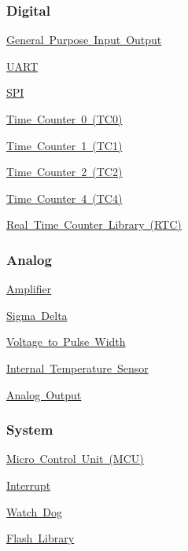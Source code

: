 \subsubsection*{Digital}


\begin{DoxyItemize}
\item \mbox{\hyperlink{a00144}{General Purpose Input Output}}
\item \mbox{\hyperlink{a00158}{U\+A\+RT}}
\item \mbox{\hyperlink{a00149}{S\+PI}}
\item \mbox{\hyperlink{a00153}{Time Counter 0 (T\+C0)}}
\item \mbox{\hyperlink{a00154}{Time Counter 1 (T\+C1)}}
\item \mbox{\hyperlink{a00155}{Time Counter 2 (T\+C2)}}
\item \mbox{\hyperlink{a00156}{Time Counter 4 (T\+C4)}}
\item \mbox{\hyperlink{a00157}{Real Time Counter Library (R\+TC)}}
\end{DoxyItemize}

\subsubsection*{Analog}


\begin{DoxyItemize}
\item \mbox{\hyperlink{a00146}{Amplifier}}
\item \mbox{\hyperlink{a00147}{Sigma Delta}}
\item \mbox{\hyperlink{a00159}{Voltage to Pulse Width}}
\item \mbox{\hyperlink{a00142}{Internal Temperature Sensor}}
\item \mbox{\hyperlink{a00139}{Analog Output}}
\end{DoxyItemize}

\subsubsection*{System}


\begin{DoxyItemize}
\item \mbox{\hyperlink{a00145}{Micro Control Unit (M\+CU)}}
\item \mbox{\hyperlink{a00143}{Interrupt}}
\item \mbox{\hyperlink{a00160}{Watch Dog}}
\item \mbox{\hyperlink{a00141}{Flash Library}}
\end{DoxyItemize}

